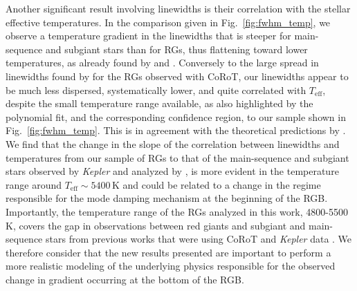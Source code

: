 \documentclass[structabstract]{aa}
\newcommand{\kepler}{\textit{Kepler} }
\begin{document}
Another significant result involving linewidths is their correlation with the stellar effective temperatures. In the comparison given in Fig.~\ref{fig:fwhm_temp}, we observe a temperature gradient in the linewidths that is steeper for main-sequence and subgiant stars than for RGs, thus flattening toward lower temperatures, as already found by \cite{Baudin11temp} and \cite{Belkacem12}. Conversely to the large spread in linewidths found by \cite{Baudin11temp} for the RGs observed with CoRoT, our linewidths appear to be much less dispersed, systematically lower, and quite correlated with $T_\mathrm{eff}$, despite the small temperature range available, as also highlighted by the polynomial fit, and the corresponding confidence region, to our sample shown in Fig.~\ref{fig:fwhm_temp}. This is in agreement with the theoretical predictions by \cite{Belkacem12}. We find that the change in the slope of the correlation between linewidths and temperatures from our sample of RGs to that of the main-sequence and subgiant stars observed by \kepler and analyzed by \cite{App12fwhm}, is more evident in the temperature range around $T_\mathrm{eff} \sim 5400$\,K and could be related to a change in the regime responsible for the mode damping mechanism at the beginning of the RGB. Importantly, the temperature range of the RGs analyzed in this work, 4800-5500\,K, covers the gap in observations between red giants and subgiant and main-sequence stars from previous works that were using CoRoT and \kepler data \citep[e.g.][]{Baudin11temp,Belkacem12,Corsaro12}. We therefore consider that the new results presented are important to perform a more realistic modeling of the underlying physics responsible for the observed change in gradient occurring at the bottom of the RGB.
\end{document}
